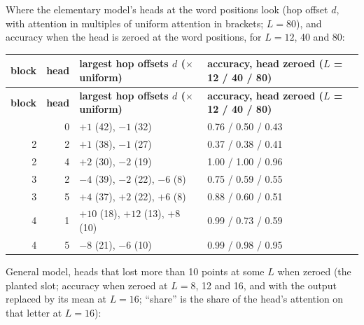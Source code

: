 \documentclass[paper=a4,fontsize=11pt,DIV=11,parskip=half,headings=small,numbers=noendperiod]{scrartcl}
\DeclareRobustCommand{\hdr}[1]{\textsf{\bfseries #1}}
\begin{document}
Where the elementary model’s heads at the word positions look (hop offset $d$, with attention in multiples of
uniform attention in brackets; $L=80$), and accuracy when the head is zeroed at the word positions, for $L=12$,
40 and 80:

{\small\nopagebreak[4]
\begin{longtable}{@{}r r >{\raggedright\arraybackslash}p{4.6cm} l@{}}
\toprule
\hdr{block} & \hdr{head} & \hdr{largest hop offsets $d$ ($\times$ uniform)} & \hdr{accuracy, head zeroed ($L$ = 12 / 40 / 80)} \\
\midrule
\endfirsthead
\toprule
\hdr{block} & \hdr{head} & \hdr{largest hop offsets $d$ ($\times$ uniform)} & \hdr{accuracy, head zeroed ($L$ = 12 / 40 / 80)} \\
\midrule
\endhead
\bottomrule
\endlastfoot
1 & 0 & $+1$ (42), $-1$ (32) & 0.76 / 0.50 / 0.43 \\
2 & 2 & $+1$ (38), $-1$ (27) & 0.37 / 0.38 / 0.41 \\
2 & 4 & $+2$ (30), $-2$ (19) & 1.00 / 1.00 / 0.96 \\
3 & 2 & $-4$ (39), $-2$ (22), $-6$ (8) & 0.75 / 0.59 / 0.55 \\
3 & 5 & $+4$ (37), $+2$ (22), $+6$ (8) & 0.88 / 0.60 / 0.51 \\
4 & 1 & $+10$ (18), $+12$ (13), $+8$ (10) & 0.99 / 0.73 / 0.59 \\
4 & 5 & $-8$ (21), $-6$ (10) & 0.99 / 0.98 / 0.95 \\
\end{longtable}}

General model, heads that lost more than 10 points at some $L$ when zeroed (the planted slot; accuracy when
zeroed at $L=8$, 12 and 16, and with the output replaced by its mean at $L=16$; “share” is the share of the
head’s attention on that letter at $L=16$):
\end{document}
